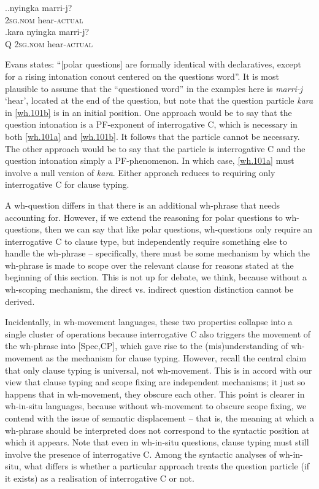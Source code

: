\documentclass[11pt]{article}
\begin{document}
\ex.\ag.\label{wh.101a}nyingka marri-j?\\
   \textsc{2sg.nom} hear-\textsc{actual}\\
   \bg.\label{wh.101b}kara nyingka marri-j?\\
   Q \textsc{2sg.nom} hear-\textsc{actual}\\
   \hspace{\fill}\citep[364--365]{evans:1995}

Evans states: ``[polar questions] are formally identical with declaratives, except for a rising intonation conout centered on the questions word''. It is most plausible to assume that the ``questioned word'' in the examples here is \textit{marri-j} `hear', located at the end of the question, but note that the question particle \textit{kara} in \ref{wh.101b} is in an initial position. One approach would be to say that the question intonation is a PF-exponent of interrogative C, which is necessary in both \ref{wh.101a} and \ref{wh.101b}. It follows that the particle cannot be necessary. The other approach would be to say that the particle is interrogative C and the question intonation simply a PF-phenomenon. In which case, \ref{wh.101a} must involve a null version of \textit{kara}. Either approach reduces to requiring only interrogative C for clause typing.

A wh-question differs in that there is an additional wh-phrase that needs accounting for. However, if we extend the reasoning for polar questions to wh-questions, then we can say that like polar questions, wh-questions only require an interrogative C to clause type, but independently require something else to handle the wh-phrase -- specifically, there must be some mechanism by which the wh-phrase is made to scope over the relevant clause for reasons stated at the beginning of this section. This is not up for debate, we think, because without a wh-scoping mechanism, the direct vs. indirect question distinction cannot be derived.

Incidentally, in wh-movement languages, these two properties collapse into a single cluster of operations because interrogative C also triggers the movement of the wh-phrase into [Spec,CP], which gave rise to the (mis)understanding of wh-movement as the mechanism for clause typing. However, recall the central claim that only clause typing is universal, not wh-movement. This is in accord with our view that clause typing and scope fixing are independent mechanisms; it just so happens that in wh-movement, they obscure each other. This point is clearer in wh-in-situ languages, because without wh-movement to obscure scope fixing, we contend with the issue of semantic displacement -- that is, the meaning at which a wh-phrase should be interpreted does not correspond to the syntactic position at which it appears. Note that even in wh-in-situ questions, clause typing must still involve the presence of interrogative C. Among the syntactic analyses of wh-in-situ, what differs is whether a particular approach treats the question particle (if it exists) as a realisation of interrogative C or not.
\end{document}
